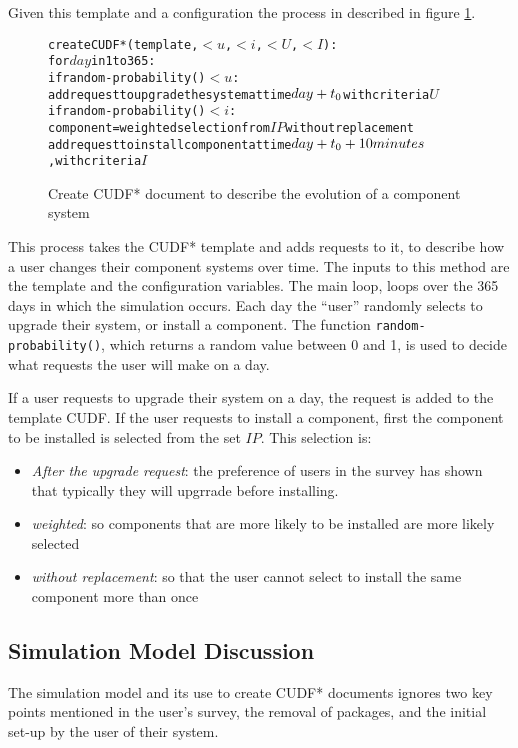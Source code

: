 Given this template and a configuration the process in described in figure \ref{sim.CUDF*}.
\begin{figure}[h]
\begin{center}
\begin{alltt}
createCUDF*(template, \(< u\), \(< i\), \(< U\), \(< I\)):
  for \(day\) in 1 to 365:
    if random-probability() \(< u\):
      add request to upgrade the system at time \(day + t\sb{0}\) with criteria \(U\)
    if random-probability() \(< i\):  
      component = weighted selection from \(IP\) without replacement 
      add request to install component at time \(day + t\sb{0} + 10 minutes\), with criteria \(I\)
\end{alltt}
  \caption{Create CUDF* document to describe the evolution of a component system}
  \label{sim.CUDF*}
\end{center}
\end{figure}

This process takes the CUDF* template and adds requests to it, to describe how a user changes their component systems over time.
The inputs to this method are the template and the configuration variables.
The main loop, loops over the 365 days in which the simulation occurs.
Each day the ``user'' randomly selects to upgrade their system, or install a component.
The function \texttt{random-probability()}, which returns a random value between 0 and 1, is used to decide what requests the user will make on a day.

If a user requests to upgrade their system on a day, the request is added to the template CUDF.
If the user requests to install a component, first the component to be installed is selected from the set $IP$.
This selection is: 
\begin{itemize}
  \item \textit{After the upgrade request}: the preference of users in the survey has shown that typically they will upgrrade before installing.  
  \item \textit{weighted}: so components that are more likely to be installed are more likely selected
  \item \textit{without replacement}: so that the user cannot select to install the same component more than once
\end{itemize} 


\subsection{Simulation Model Discussion}
The simulation model and its use to create CUDF* documents ignores two key points mentioned in the user's survey,
the removal of packages, and the initial set-up by the user of their system.

